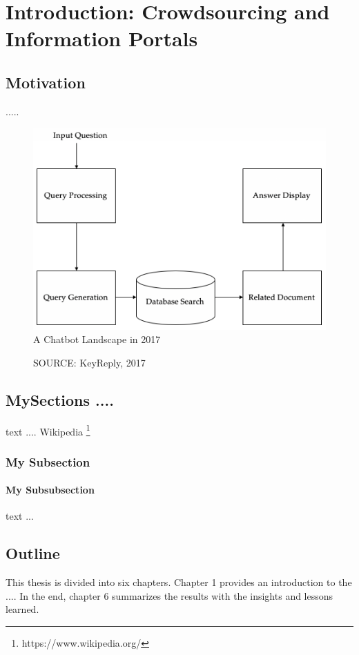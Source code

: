 \chapter{Introduction: Crowdsourcing and Information Portals}
\label{cha:introduction}
\section{Motivation}

.....

\begin{figure}[!ht]
	\centering
	\includegraphics[width=0.5 \textwidth]{images/qa.png}\\
	\caption{A Chatbot Landscape in 2017}
    \caption*{SOURCE: KeyReply, 2017}
	\label{fig:ch1_chatbotlandscape}
\end{figure}

\section{MySections .... }
text .... Wikipedia \footnote{https://www.wikipedia.org/}

\subsection{My Subsection}
\subsubsection{My Subsubsection}
text ... 


\section{Outline}
This thesis is divided into six chapters. Chapter 1 provides an introduction to the  .... In the end, chapter 6 summarizes the results with the insights and lessons learned. 